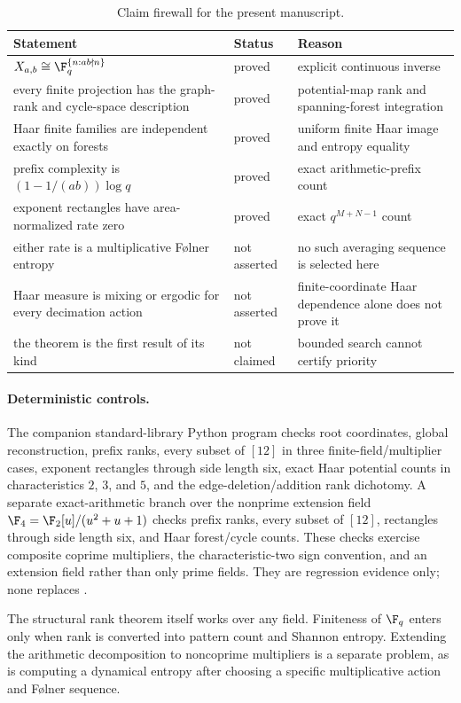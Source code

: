 \begin{table}[ht]
\centering
\caption{Claim firewall for the present manuscript.}\label{tab:firewall}
\small
\begin{tabularx}{\textwidth}{@{}>{\raggedright\arraybackslash}p{}
>{\raggedright\arraybackslash}p{}Y@{}}
\toprule
Statement & Status & Reason\\
\midrule
$X_{a,b}\cong\F_q^{\{n:ab\nmid n\}}$ & proved & explicit continuous inverse\\
every finite projection has the graph-rank and cycle-space description & proved & potential-map rank and spanning-forest integration\\
Haar finite families are independent exactly on forests & proved & uniform finite Haar image and entropy equality\\
prefix complexity is $(1-1/(ab))\log q$ & proved & exact arithmetic-prefix count\\
exponent rectangles have area-normalized rate zero & proved & exact $q^{M+N-1}$ count\\
either rate is a multiplicative F\o lner entropy & not asserted & no such averaging sequence is selected here\\
Haar measure is mixing or ergodic for every decimation action & not asserted & finite-coordinate Haar dependence alone does not prove it\\
the theorem is the first result of its kind & not claimed & bounded search cannot certify priority\\
\bottomrule
\end{tabularx}
\end{table}

\paragraph{Deterministic controls.}
The companion standard-library Python program checks root coordinates,
global reconstruction, prefix ranks, every subset of $[12]$ in three
finite-field/multiplier cases, exponent rectangles through side length six,
exact Haar potential counts in characteristics $2$, $3$, and $5$, and the
edge-deletion/addition rank dichotomy.  A separate exact-arithmetic branch
over the nonprime extension field
$\F_4=\F_2[u]/(u^2+u+1)$ checks prefix ranks, every subset of $[12]$,
rectangles through side length six, and Haar forest/cycle counts.  These
checks exercise composite coprime multipliers, the characteristic-two sign
convention, and an extension field rather than only prime fields.  They are
regression evidence only; none replaces
.

The structural rank theorem itself works over any field.  Finiteness of
$\F_q$ enters only when rank is converted into pattern count and Shannon
entropy.  Extending the arithmetic decomposition to noncoprime multipliers is
a separate problem, as is computing a dynamical entropy after choosing a
specific multiplicative action and F\o lner sequence.
